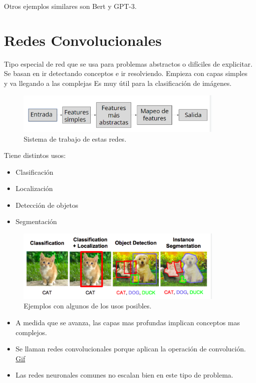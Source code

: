 \documentclass[titlepage,a4paper]{article}
\begin{document}
Otros ejemplos similares son Bert y GPT-3.

\newpage

\section{Redes Convolucionales}
Tipo especial de red que se usa para problemas abstractos o difíciles de explicitar. Se basan en ir detectando conceptos e ir resolviendo. Empieza con capas simples y va llegando a las complejas Es muy útil para la clasificación de imágenes.

\begin{figure}[!htb]
    \centering
    \includegraphics[width=0.9\textwidth]{imagenesResumen/RedesConvolucionalesSistema.PNG}
    \caption{Sistema de trabajo de estas redes.}
\end{figure}

Tiene distintos usos:
\begin{itemize}
    \item Clasificación
    \item Localización
    \item Detección de objetos
    \item Segmentación
\end{itemize}

\begin{figure}[!htb]
    \centering
    \includegraphics[width=0.9\textwidth]{imagenesResumen/TiposDeUsosRedesConvolucionales.PNG}
    \caption{Ejemplos con algunos de los usos posibles.}
\end{figure}

\begin{itemize}
    \item A medida que se avanza, las capas mas profundas implican conceptos mas complejos.
    \item Se llaman redes convolucionales porque aplican la operación de convolución. \href{https://i1.wp.com/datasmarts.net/es/wp-content/uploads/2018/11/full_padding_no_strides_transposed.gif?resize=264\%2C300&ssl=1}{Gif}
    \item Las redes neuronales comunes no escalan bien en este tipo de problema.
\end{itemize}
\end{document}
